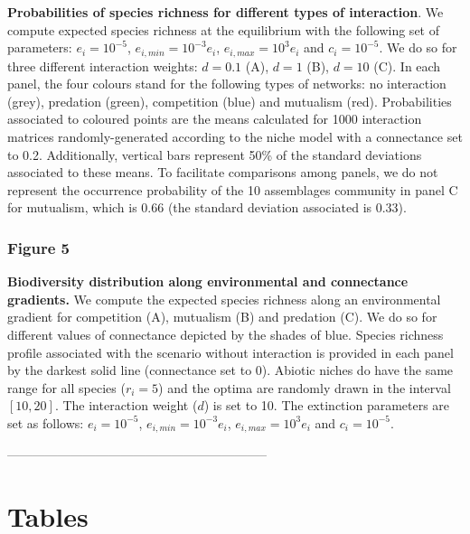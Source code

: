 \textbf{Probabilities of species richness for different types of interaction}. We compute expected species richness at the equilibrium with the following set of parameters: $e_i=10^{-5}$, $e_{i,min}=10^{-3}e_i$, $e_{i,max}=10^{3}e_i$ and $c_i=10^{-5}$. We do so for three different interaction weights: $d=0.1$ (A), $d=1$ (B), $d=10$ (C). In each panel, the four colours stand for the following types of networks: no interaction (grey), predation (green), competition (blue) and mutualism (red). Probabilities associated to coloured points are the means calculated for 1000 interaction matrices randomly-generated according to the niche model \citep{Williams2000Simple} with a connectance set to 0.2. Additionally, vertical bars represent 50\% of the standard deviations associated to these means. To facilitate comparisons among panels, we do not represent the occurrence probability of the 10 assemblages community in panel C for mutualism, which is 0.66 (the standard deviation associated is 0.33).

\newpage

\subsubsection*{Figure 5}

\textbf{Biodiversity distribution along environmental and connectance gradients.} We compute the expected species richness along an environmental gradient for competition (A), mutualism (B) and predation (C). We do so for different values of connectance depicted by the shades of blue. Species richness profile associated with the scenario without interaction is provided in each panel by the darkest solid line (connectance set to 0). Abiotic niches do have the same range for all species ($r_i=5$) and the optima are randomly drawn in the interval $[10,20]$. The interaction weight ($d$) is set to 10. The extinction parameters are set as follows: $e_i=10^{-5}$, $e_{i,min}=10^{-3}e_i$, $e_{i,max}=10^{3}e_i$ and $c_i=10^{-5}$.

\newpage


--------------------------------------------------------------
\section{Tables}

